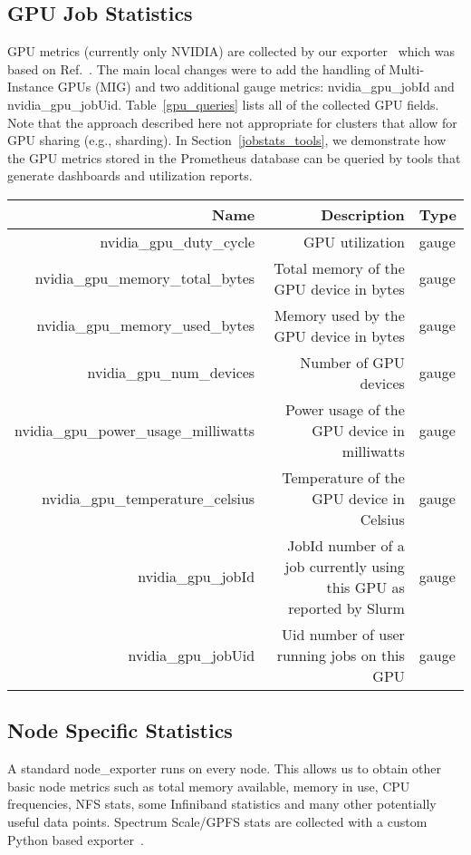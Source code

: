 \subsection{GPU Job Statistics}
GPU metrics (currently only NVIDIA) are collected by our exporter~\cite{nvidia_exporter_plazonic} which was based on Ref.~\cite{nvidia_exporter_rohit}. The main local changes were to add the handling of Multi-Instance GPUs (MIG) and two additional gauge metrics: nvidia\_gpu\_jobId and nvidia\_gpu\_jobUid. Table~\ref{gpu_queries} lists all of the collected GPU fields. Note that the approach described here not appropriate for clusters that allow for GPU sharing (e.g., sharding). In Section~\ref{jobstats_tools}, we demonstrate how the GPU metrics stored in the Prometheus database can be queried by tools that generate dashboards and utilization reports.

\begin{table*}
  \caption{GPU metrics made available by the NVIDIA exporter.}
  \label{gpu_queries}
  \begin{tabular}{rrl}
    \toprule
    Name & Description & Type\\
    \midrule
    nvidia\_gpu\_duty\_cycle & GPU utilization & gauge \\
    nvidia\_gpu\_memory\_total\_bytes & Total memory of the GPU device in bytes & gauge\\
    nvidia\_gpu\_memory\_used\_bytes & Memory used by the GPU device in bytes & gauge\\
    nvidia\_gpu\_num\_devices & Number of GPU devices & gauge\\
    nvidia\_gpu\_power\_usage\_milliwatts & Power usage of the GPU device in milliwatts & gauge\\
    nvidia\_gpu\_temperature\_celsius & Temperature of the GPU device in Celsius & gauge\\
    nvidia\_gpu\_jobId & JobId number of a job currently using this GPU as reported by Slurm & gauge\\
    nvidia\_gpu\_jobUid & Uid number of user running jobs on this GPU & gauge\\
    \bottomrule
  \end{tabular}
\end{table*}


\subsection{Node Specific Statistics}
A standard node\_exporter runs on every node. This allows us to obtain other basic node metrics such as total memory available, memory in use, CPU frequencies, NFS stats, some Infiniband statistics and many other potentially useful data points. Spectrum Scale/GPFS stats are collected with a custom Python based exporter~\cite{gpfs_exporter}.

